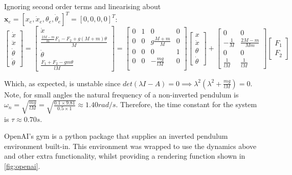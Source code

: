 \documentclass[../main.tex]{subfiles}
\begin{document}
Ignoring second order terms and linearising about $\boldsymbol{x}_e = [x_e, \dot{x}_e, \theta_e, \dot{\theta}_e]^T = [0, 0, 0, 0]^T$:
\begin{equation}
\begin{bmatrix} \dot{x} \\ \ddot{x} \\ \dot{\theta} \\ \ddot{\theta} \end{bmatrix} 
=   \begin{bmatrix} 
    \dot{x} \\ 
    \frac{\frac{2M-m}{m}F_1-F_2 + g(M+m)\theta}{M} \\ 
    \dot{\theta} \\ 
    \frac{F_1 + F_2 - gm\theta}{lM} 
    \end{bmatrix}
=   \begin{bmatrix} 
    0 & 1 & 0 & 0 \\
    0 & 0 & g\frac{M+m}{M} & 0 \\
    0 & 0 & 0 & 1 \\
    0 & 0 & -\frac{mg}{lM} & 0 \\
    \end{bmatrix}
    \begin{bmatrix} x \\ \dot{x} \\ \theta \\ \dot{\theta} \end{bmatrix}
+  \begin{bmatrix} 0 & 0 \\ -\frac{1}{M} & \frac{2M-m}{Mm} \\ 0 & 0 \\ \frac{1}{lM} & \frac{1}{lM} \end{bmatrix} 
\begin{bmatrix} F_1 \\ F_2 \end{bmatrix}
\end{equation}

Which, as expected, is unstable since $det(\lambda I - A) = 0 \implies \lambda^2(\lambda^2 + \frac{mg}{lM}) = 0$. Note, for small angles the natural frequency of a non-inverted pendulum is $\omega_n = \sqrt{\frac{mg}{lM}} = \sqrt{\frac{0.1\times 9.81}{0.5\times 1}} \approx 1.40 rad/s$. Therefore, the time constant for the system is $\tau \approx 0.70s$. 

OpenAI's gym is a python package that supplies an inverted pendulum environment built-in. This environment was wrapped to use the dynamics above and other extra functionality, whilst providing a rendering function shown in \cref{fig:openai}.
\end{document}
